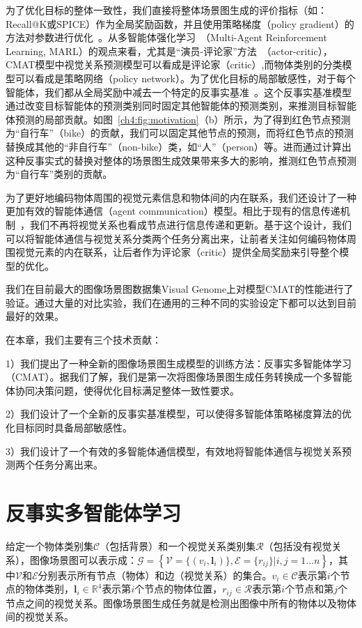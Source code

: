 为了优化目标的整体一致性，我们直接将整体场景图生成的评价指标（如：Recall@K或SPICE）作为全局奖励函数，并且使用策略梯度（policy gradient）的方法对参数进行优化~\cite{sutton2000policy}。从多智能体强化学习~\cite{tampuu2017multiagent,lowe2017multi}（Multi-Agent Reinforcement Learning, MARL）的观点来看，尤其是“演员-评论家”方法~\cite{lowe2017multi}（actor-critic），CMAT模型中视觉关系预测模型可以看成是评论家（critic）,而物体类别的分类模型可以看成是策略网络（policy network）。为了优化目标的局部敏感性，对于每个智能体，我们都从全局奖励中减去一个特定的反事实基准~\cite{foerster2018counterfactual}。这个反事实基准模型通过改变目标智能体的预测类别同时固定其他智能体的预测类别，来推测目标智能体预测的局部贡献。如图~\ref{ch4:fig:motivation}（b）所示，为了得到红色节点预测为“自行车”（bike）的贡献，我们可以固定其他节点的预测，而将红色节点的预测替换成其他的“非自行车”（non-bike）类，如“人”（person）等。进而通过计算出这种反事实式的替换对整体的场景图生成效果带来多大的影响，推测红色节点预测为“自行车”类别的贡献。

为了更好地编码物体周围的视觉元素信息和物体间的内在联系，我们还设计了一种更加有效的智能体通信（agent communication）模型。相比于现有的信息传递机制~\cite{xu2017scene, li2017scene, jae2018tensorize, li2017vip, yin2018zoom, li2018factorizable}，我们不再将视觉关系也看成节点进行信息传递和更新。基于这个设计，我们可以将智能体通信与视觉关系分类两个任务分离出来，让前者关注如何编码物体周围视觉元素的内在联系，让后者作为评论家（critic）提供全局奖励来引导整个模型的优化。

我们在目前最大的图像场景图数据集Visual Genome上对模型CMAT的性能进行了验证。通过大量的对比实验，我们在通用的三种不同的实验设定下都可以达到目前最好的效果。

在本章，我们主要有三个技术贡献：

1）我们提出了一种全新的图像场景图生成模型的训练方法：反事实多智能体学习（CMAT）。据我们了解，我们是第一次将图像场景图生成任务转换成一个多智能体协同决策问题，使得优化目标满足整体一致性要求。

2）我们设计了一个全新的反事实基准模型，可以使得多智能体策略梯度算法的优化目标同时具备局部敏感性。

3）我们设计了一个有效的多智能体通信模型，有效地将智能体通信与视觉关系预测两个任务分离出来。


\section{反事实多智能体学习}
给定一个物体类别集$\mathcal{C}$（包括背景）和一个视觉关系类别集$\mathcal{R}$（包括没有视觉关系），图像场景图可以表示成：$\mathcal{G} = \left\{ \mathcal{V}=\{(v_i, \bm{l}_i)\},\mathcal{E}=\{r_{ij}\} | i,j = 1...n \right\}$，其中$\mathcal{V}$和$\mathcal{E}$分别表示所有节点（物体）和边（视觉关系）的集合。$v_i \in \mathcal{C}$表示第$i$个节点的物体类别，$\bm{l}_i \in \mathbb{R}^4$表示第$i$个节点的物体位置，$r_{ij} \in \mathcal{R}$表示第$i$个节点和第$j$个节点之间的视觉关系。图像场景图生成任务就是检测出图像中所有的物体以及物体间的视觉关系。


